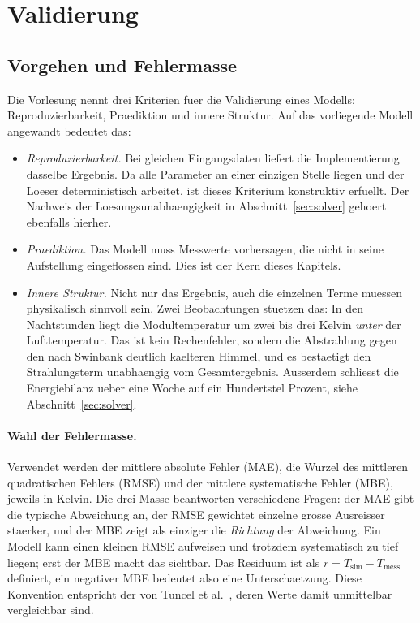 \section{Validierung}
\label{sec:validierung}


\subsection{Vorgehen und Fehlermasse}

Die Vorlesung nennt drei Kriterien fuer die Validierung eines Modells:
Reproduzierbarkeit, Praediktion und innere Struktur. Auf das vorliegende
Modell angewandt bedeutet das:

\begin{itemize}
  \item \emph{Reproduzierbarkeit.} Bei gleichen Eingangsdaten liefert die
        Implementierung dasselbe Ergebnis. Da alle Parameter an einer
        einzigen Stelle liegen und der Loeser deterministisch arbeitet, ist
        dieses Kriterium konstruktiv erfuellt. Der Nachweis der
        Loesungsunabhaengigkeit in Abschnitt~\ref{sec:solver} gehoert
        ebenfalls hierher.
  \item \emph{Praediktion.} Das Modell muss Messwerte vorhersagen, die
        nicht in seine Aufstellung eingeflossen sind. Dies ist der Kern
        dieses Kapitels.
  \item \emph{Innere Struktur.} Nicht nur das Ergebnis, auch die einzelnen
        Terme muessen physikalisch sinnvoll sein. Zwei Beobachtungen stuetzen
        das: In den Nachtstunden liegt die Modultemperatur um zwei bis drei
        Kelvin \emph{unter} der Lufttemperatur. Das ist kein Rechenfehler,
        sondern die Abstrahlung gegen den nach Swinbank deutlich kaelteren
        Himmel, und es bestaetigt den Strahlungsterm unabhaengig vom
        Gesamtergebnis. Ausserdem schliesst die Energiebilanz ueber eine
        Woche auf ein Hundertstel Prozent, siehe
        Abschnitt~\ref{sec:solver}.
\end{itemize}

\paragraph{Wahl der Fehlermasse.}
Verwendet werden der mittlere absolute Fehler (MAE), die Wurzel des
mittleren quadratischen Fehlers (RMSE) und der mittlere systematische Fehler
(MBE), jeweils in Kelvin. Die drei Masse beantworten verschiedene Fragen:
der MAE gibt die typische Abweichung an, der RMSE gewichtet einzelne grosse
Ausreisser staerker, und der MBE zeigt als einziger die \emph{Richtung} der
Abweichung. Ein Modell kann einen kleinen RMSE aufweisen und trotzdem
systematisch zu tief liegen; erst der MBE macht das sichtbar. Das Residuum
ist als $r = T_\mathrm{sim} - T_\mathrm{mess}$ definiert, ein negativer MBE
bedeutet also eine Unterschaetzung. Diese Konvention entspricht der von
Tuncel et al.~\cite{tuncel2020}, deren Werte damit unmittelbar
vergleichbar sind.

